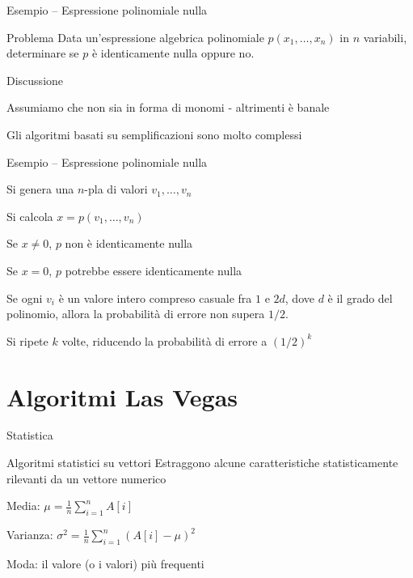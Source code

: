 \begin{frame}{Esempio -- Espressione polinomiale nulla}

\vspace{-9pt}
\begin{block}{Problema}
Data un’espressione algebrica polinomiale $p(x_1 , \ldots , x_n)$ 
in $n$ variabili, determinare se $p$ è identicamente nulla oppure no.
\end{block}

\bigskip
Discussione
\BIL
\item Assumiamo che non sia in forma di monomi - altrimenti è banale
\item Gli algoritmi basati su semplificazioni sono molto complessi
\EIL

\end{frame}


\begin{frame}{Esempio -- Espressione polinomiale nulla}

\BIL
\item Si genera una $n$-pla di valori $v_1, \ldots, v_n$
\item Si calcola $x= p(v_1 , \ldots , v_n)$
  \BI
	\item Se $x \neq 0$, $p$ non è identicamente nulla
	\item Se $x = 0$, $p$ \alert{potrebbe} essere identicamente nulla
	\EI
\item Se ogni $v_i$ è un valore intero compreso casuale fra $1$ e $2d$, dove $d$ è 
il grado del polinomio, allora la probabilità di errore non supera $1/2$.
\item Si ripete $k$ volte, riducendo la probabilità di errore a $(1/2)^k$
\EIL

\end{frame}

\section{Algoritmi Las Vegas}

\begin{frame}{Statistica}

\begin{block}{Algoritmi statistici su vettori}
Estraggono alcune caratteristiche statisticamente rilevanti da un vettore numerico 
\end{block}

\medskip
{}
\BIL
\item \alert{Media}: $\mu = \frac{1}{n} 	\sum_{i=1}^n A[i]$
\item \alert{Varianza}: $\sigma^2 = \frac{1}{n} \sum_{i=1}^n (A[i]- \mu)^2$
\item \alert{Moda}: il valore (o i valori) più frequenti
\EIL
\end{frame}

